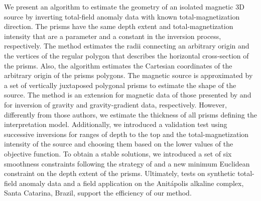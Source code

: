 We present an algorithm to estimate the geometry of an isolated magnetic 3D source by inverting total-field anomaly data with known total-magnetization direction. The prisms have the same depth extent and total-magnetization intensity that are a parameter and a constant in the inversion process, respectively. The method estimates the radii connecting an arbitrary origin and the vertices of the regular polygon that describes the horizontal cross-section of the prisms. Also, the algorithm estimates the Cartesian coordinates of the arbitrary origin of the prisms polygons. The magnetic source is approximated by a set of vertically juxtaposed polygonal prisms to estimate the shape of the source. The method is an extension for magnetic data of those presented by \cite{oliveirajr-etal2011} and \cite{oliveirajr-etal2015} for inversion of gravity and gravity-gradient data, respectively. However, differently from those authors, we estimate the thickness of all prisms defining the interpretation model. Additionally, we introduced a validation test using successive inversions for ranges of depth to the top and the total-magnetization intensity of the source and choosing them based on the lower values of the objective function. To obtain a stable solutions, we introduced a set of six smoothness constraints following the strategy of \cite{oliveirajr-etal2011} and a new minimum Euclidean constraint on the depth extent of the prisms. Ultimately, tests on synthetic total-field anomaly data and a field application on the Anitápolis alkaline complex, Santa Catarina, Brazil, support the efficiency of our method.